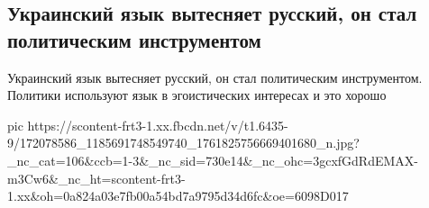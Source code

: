  
 
 
 
 

\subsection{Украинский язык вытесняет русский, он стал политическим инструментом}
\label{sec:12_04_2021.fb.berdnik_miroslava.2.mova_jazyk}

Украинский язык вытесняет русский, он стал политическим инструментом. Политики
используют язык в эгоистических интересах и это хорошо

\ifcmt
  pic https://scontent-frt3-1.xx.fbcdn.net/v/t1.6435-9/172078586_1185691748549740_1761825756669401680_n.jpg?_nc_cat=106&ccb=1-3&_nc_sid=730e14&_nc_ohc=3gcxfGdRdEMAX-m3Cw6&_nc_ht=scontent-frt3-1.xx&oh=0a824a03e7fb00a54bd7a9795d34d6fc&oe=6098D017
\fi


